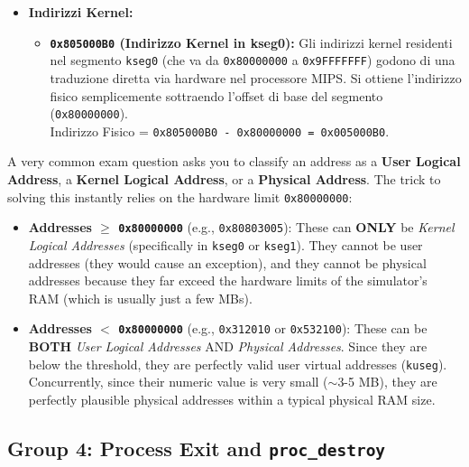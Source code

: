 \begin{itemize}
\begin{itemize}
        \texttt{0x400000 + 0x10010 = 0x410010}.
    \end{itemize}
    \item \textbf{Indirizzi Kernel:}
    \begin{itemize}
        \item \textbf{\texttt{0x805000B0} (Indirizzo Kernel in kseg0):} Gli indirizzi kernel residenti nel segmento \texttt{kseg0} (che va da \texttt{0x80000000} a \texttt{0x9FFFFFFF}) godono di una traduzione diretta via hardware nel processore MIPS. Si ottiene l'indirizzo fisico semplicemente sottraendo l'offset di base del segmento (\texttt{0x80000000}).\\
        Indirizzo Fisico = \texttt{0x805000B0 - 0x80000000 = 0x005000B0}.
    \end{itemize}
\end{itemize}

\begin{tcolorbox}[colback=blue!5!white,colframe=blue!75!black,title=Exam Insight: The Address Classification Trick (e.g. Q15)]
A very common exam question asks you to classify an address as a \textbf{User Logical Address}, a \textbf{Kernel Logical Address}, or a \textbf{Physical Address}. The trick to solving this instantly relies on the hardware limit \texttt{0x80000000}:
\begin{itemize}
    \item \textbf{Addresses $\geq$ \texttt{0x80000000}} (e.g., \texttt{0x80803005}): These can \textbf{ONLY} be \textit{Kernel Logical Addresses} (specifically in \texttt{kseg0} or \texttt{kseg1}). They cannot be user addresses (they would cause an exception), and they cannot be physical addresses because they far exceed the hardware limits of the simulator's RAM (which is usually just a few MBs).
    \item \textbf{Addresses $<$ \texttt{0x80000000}} (e.g., \texttt{0x312010} or \texttt{0x532100}): These can be \textbf{BOTH} \textit{User Logical Addresses} AND \textit{Physical Addresses}. Since they are below the threshold, they are perfectly valid user virtual addresses (\texttt{kuseg}). Concurrently, since their numeric value is very small ($\sim$3-5 MB), they are perfectly plausible physical addresses within a typical physical RAM size.
\end{itemize}
\end{tcolorbox}

\newpage
\subsection*{Group 4: Process Exit and \texttt{proc\_destroy}}

